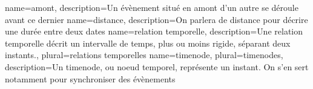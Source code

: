{
    name=amont,
    description={Un évènement situé en amont d'un autre se déroule avant ce dernier}
}
{
    name=distance,
    description={On parlera de distance pour décrire une durée entre deux dates}
}
{
  name={relation temporelle},
  description={Une relation temporelle décrit un intervalle de temps, plus ou moins rigide, séparant deux instants.},
  plural={relations temporelles}
}
{
  name={timenode},
  plural={timenodes},
  description={Un timenode, ou noeud temporel, représente un instant. On s'en sert notamment pour synchroniser des évènements}
}






